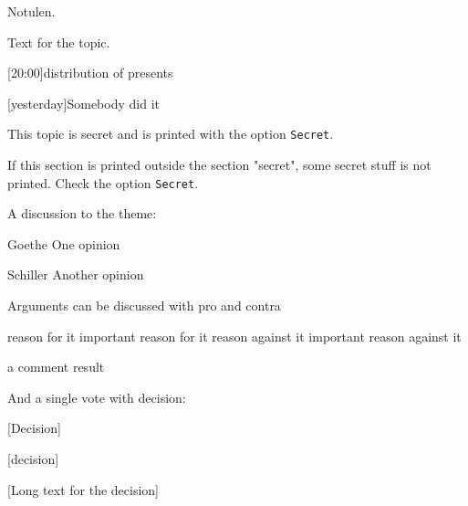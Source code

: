 \begin{Minutes}{Notulen.}
\maketitle

Text for the topic.

[20:00]{distribution of presents}

[yesterday]{Somebody did it}


\newcols[][1]%
\begin{Secret}
This topic is secret and is printed with the option
\texttt{Secret}.
\end{Secret}
If this section is printed outside the section "secret", some
secret stuff is not printed. Check the option \texttt{Secret}.
\newcols




A discussion to the theme:
\begin{Opinions}
\item[Goethe] One opinion
\item[Schiller] Another opinion
\end{Opinions}

Arguments can be discussed with pro and contra
\begin{Argumentation}
\pro reason for it
\Pro important reason for it
\contra reason against it
\Contra important reason against it
\item a comment
\result result
\end{Argumentation}


And a single vote with decision:\par
{}[Decision]

\begin{Vote}
[decision]

\end{Vote}

[Long text for the decision]
\end{Minutes}